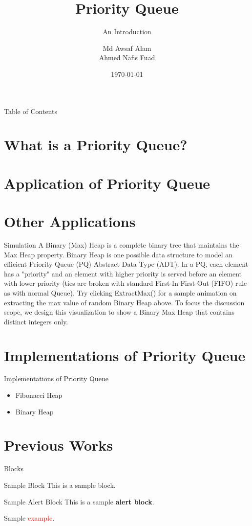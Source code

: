 \documentclass{beamer}
\title[Priority Queue]{Priority Queue}
\subtitle{An Introduction}
\author[A.A. and A.N.F]{Md Awsaf Alam \inst{1} \\ Ahmed Nafis Fuad\inst{2}}
\institute{
\inst{1}
Department of CSE\\
BUET\\
\inst{2}
Department of CSE\\
BUET
}
\date{\today}
\begin{document}
\titlepage

\begin{frame}{Table of Contents}
\tableofcontents

\end{frame}

\section{What is a Priority Queue?}



\section{Application of Priority Queue}


\section{Other Applications}
\begin{frame}{Simulation}
  A Binary (Max) Heap is a complete binary tree that maintains the Max Heap property.
  Binary Heap is one possible data structure to model an efficient Priority Queue (PQ) Abstract Data Type (ADT). In a PQ, each element has a "priority" and an element with higher priority is served before an element with lower priority (ties are broken with standard First-In First-Out (FIFO) rule as with normal Queue). Try clicking ExtractMax() for a sample animation on extracting the max value of random Binary Heap above.
  To focus the discussion scope, we design this visualization to show a Binary Max Heap that contains distinct integers only.
\end{frame}

\section{Implementations of Priority Queue}
\begin{frame}{Implementations of Priority Queue}
\begin{itemize}
  \item Fibonacci Heap
  \item Binary Heap
\end{itemize}

\end{frame}


\section{Previous Works}
\begin{frame}{Blocks}
    \begin{block}{Sample Block}
    This is a sample block.
    \end{block}
    \begin{alertblock}{Sample Alert Block}
    This is a sample \textbf<2>{alert block}.
    \end{alertblock}
    \begin{example}
    Sample \textcolor<3->{red}{example}.
    \end{example}
\end{frame}
\end{document}
